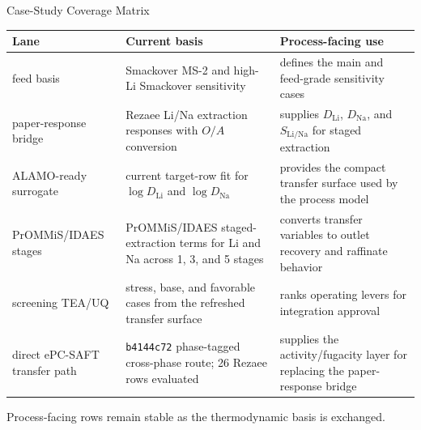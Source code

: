 \documentclass[aspectratio=169]{beamer}
\newcommand{\DLi}{D_{\mathrm{Li}}}
\newcommand{\DNa}{D_{\mathrm{Na}}}
\newcommand{\SLiNa}{S_{\mathrm{Li/Na}}}
\begin{document}
\begin{frame}{Case-Study Coverage Matrix}
  \scriptsize
  {\setlength{\tabcolsep}{3pt}\renewcommand{\arraystretch}{1.23}
  \begin{tabular}{@{}>{\raggedright\arraybackslash}p{}>{\raggedright\arraybackslash}p{}>{\raggedright\arraybackslash}p{}@{}}
    \toprule
    Lane & Current basis & Process-facing use \\
    \midrule
    feed basis & Smackover MS-2 and high-Li Smackover sensitivity &
      defines the main and feed-grade sensitivity cases \\
    paper-response bridge & Rezaee Li/Na extraction responses with $O/A$
      conversion & supplies $\DLi$, $\DNa$, and $\SLiNa$ for staged extraction \\
    ALAMO-ready surrogate & current target-row fit for $\log \DLi$ and
      $\log \DNa$ & provides the compact transfer surface used by the process
      model \\
    PrOMMiS/IDAES stages & PrOMMiS/IDAES staged-extraction terms for Li and Na
      across 1, 3, and 5 stages & converts transfer variables to outlet
      recovery and raffinate behavior \\
    screening TEA/UQ & stress, base, and favorable cases from the refreshed
      transfer surface & ranks operating levers for integration approval \\
    direct ePC-SAFT transfer path & \texttt{b4144c72} phase-tagged cross-phase
      route; 26 Rezaee rows evaluated & supplies the activity/fugacity layer for
      replacing the paper-response bridge \\
    \bottomrule
  \end{tabular}}
  \vspace{0.14cm}
  {\footnotesize\color{netlgray}
  Process-facing rows remain stable as the thermodynamic basis is exchanged.}
\end{frame}
\end{document}
